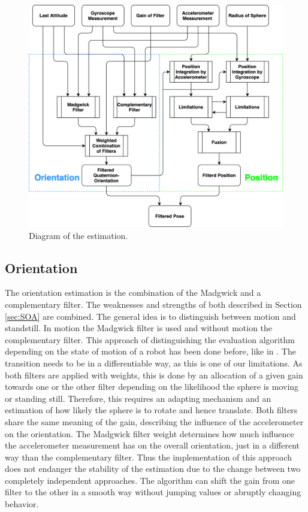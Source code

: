 \documentclass[letterpaper, 10 pt, conference]{ieeeconf}  %
\begin{document}
\begin{figure}%
\includegraphics[width=\linewidth]{./graphics/imuJasperChartSimliefiedBIG.png}
\caption{Diagram of the estimation.}
\label{generalized}
\end{figure}


\subsection{Orientation}
The orientation estimation is the combination of the Madgwick and a complementary filter.
The weaknesses and strengths of both described in Section \ref{sec:SOA} are combined. 
The general idea is to distinguish between motion and standstill.
In motion the Madgwick filter is used and without motion the complementary filter.
This approach of distinguishing the evaluation algorithm depending on the state of motion of a robot has been done before, like in \cite{Hertzberg2012}.
The transition needs to be in a differentiable way, as this is one of our limitations.  
As both filters are applied with weights, this is done by an allocation of a given gain towards one or the other filter depending on the likelihood the sphere is moving or standing still. 
Therefore, this requires an adapting mechanism and an estimation of how likely the sphere is to rotate and hence translate.
Both filters share the same meaning of the gain, describing the influence of the accelerometer on the orientation.
The Madgwick filter weight determines how much influence the accelerometer measurement has on the overall orientation, just in a different way than the complementary filter.
Thus the implementation of this approach does not endanger the stability of the estimation due to the change between two completely independent approaches.
The algorithm can shift the gain from one filter to the other in a smooth way without jumping values or abruptly changing behavior. 
\end{document}
